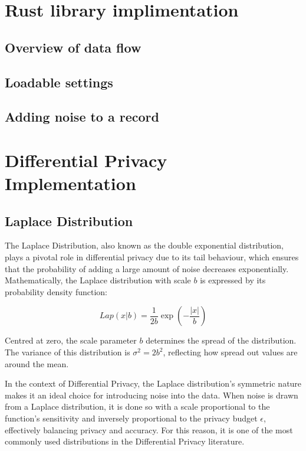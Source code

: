 \section{Rust library implimentation}
\subsection{Overview of data flow}
\subsection{Loadable settings}
\subsection{Adding noise to a record}

\section{Differential Privacy Implementation}
\subsection{Laplace Distribution}

The Laplace Distribution, also known as the double exponential distribution, plays a pivotal role in differential privacy due to its tail behaviour, which ensures that the probability of adding a large amount of noise decreases exponentially. Mathematically, the Laplace distribution with scale $b$ is expressed by its probability density function:

\begin{equation}
Lap(x|b) = \frac{1}{2b} \exp\left(-\frac{|x|}{b}\right)
\end{equation}\citep[Def. 3.2]{Dwork2013}

Centred at zero, the scale parameter $b$ determines the spread of the distribution. The variance of this distribution is $ \sigma^2 = 2b^2 $, reflecting how spread out values are around the mean\citep[p. 31]{Dwork2013}.

In the context of Differential Privacy, the Laplace distribution's symmetric nature makes it an ideal choice for introducing noise into the data. When noise is drawn from a Laplace distribution, it is done so with a scale proportional to the function's sensitivity and inversely proportional to the privacy budget $\epsilon$, effectively balancing privacy and accuracy\citep[p. 31]{Dwork2013}. For this reason, it is one of the most commonly used distributions in the Differential Privacy literature. 

